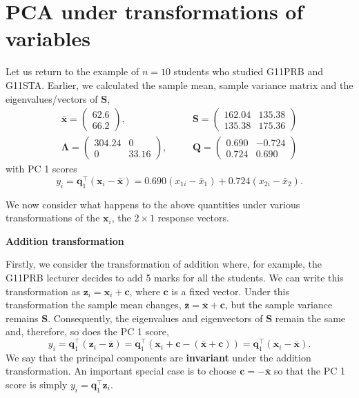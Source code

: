 \documentclass[]{book}
\theoremstyle{definition}
\theoremstyle{definition}
\theoremstyle{definition}
\theoremstyle{remark}
\begin{document}
\hypertarget{pca-under-transformations-of-variables}{%
\section{PCA under transformations of variables}\label{pca-under-transformations-of-variables}}

Let us return to the example of \(n=10\) students who studied G11PRB and G11STA. Earlier, we calculated the sample mean, sample variance matrix and the eigenvalues/vectors of \(\boldsymbol S\),
\begin{eqnarray*}
\bar{\boldsymbol x} = \begin{pmatrix} 62.6 \\ 66.2 \end{pmatrix}, &\quad&
\boldsymbol S= \begin{pmatrix} 162.04 & 135.38 \\ 135.38 & 175.36 \end{pmatrix} \\
\boldsymbol \Lambda= \begin{pmatrix} 304.24 & 0 \\ 0 & 33.16 \end{pmatrix}, &\quad&
\boldsymbol Q= \begin{pmatrix} 0.690 & -0.724 \\ 0.724 & 0.690 \end{pmatrix}
\end{eqnarray*}
with PC 1 scores
\[y_i = \boldsymbol q_1^\top (\boldsymbol x_i - \bar{\boldsymbol x}) = 0.690 (x_{1i} - \bar{x}_1) + 0.724 (x_{2i} - \bar{x}_2).\]

We now consider what happens to the above quantities under various transformations of the \(\boldsymbol x_i\), the \(2 \times 1\)
response vectors.

\textbf{Addition transformation}

Firstly, we consider the transformation of addition where, for example, the G11PRB lecturer decides to add 5 marks for all the students. We can write this transformation as \(\boldsymbol z_i = \boldsymbol x_i + \boldsymbol c\), where \(\boldsymbol c\) is a fixed vector. Under this transformation the sample mean changes, \(\bar{\boldsymbol z} = \bar{\boldsymbol x} + \boldsymbol c\), but the sample variance remains \(\boldsymbol S\). Consequently, the eigenvalues and eigenvectors of \(\boldsymbol S\) remain the same and, therefore, so does the PC 1 score,
\[y_i = \boldsymbol q_1^\top (\boldsymbol z_i - \bar{\boldsymbol z}) = \boldsymbol q_1^\top(\boldsymbol x_i + \boldsymbol c- (\bar{\boldsymbol x} + \boldsymbol c)) = \boldsymbol q_1^\top (\boldsymbol x_i - \bar{\boldsymbol x}).\]
We say that the principal components are \textbf{invariant} under the addition transformation. An important special case is to choose \(\boldsymbol c= -\bar{\boldsymbol x}\) so that the PC 1 score is simply \(y_i = \boldsymbol q_1^\top \boldsymbol z_i\).
\end{document}
